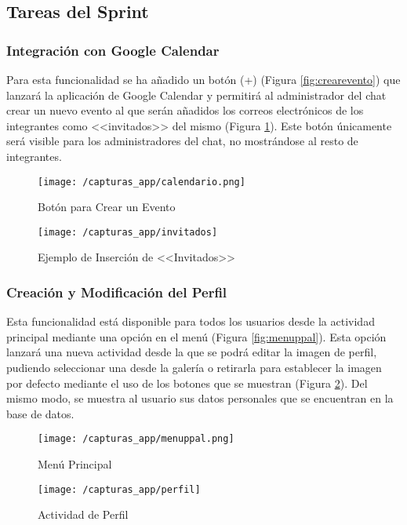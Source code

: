 \subsection{Tareas del Sprint}
\subsubsection{Integración con Google Calendar}
Para esta funcionalidad se ha añadido un botón (+) (Figura \ref{fig:crearevento}) que lanzará la aplicación de Google Calendar y permitirá al administrador del chat crear un nuevo evento al que serán añadidos los correos electrónicos de los integrantes como <<invitados>> del mismo (Figura \ref{fig:invitados}). Este botón únicamente será visible para los administradores del chat, no mostrándose al resto de integrantes.

\begin{figure}[!h]
	\centering
	\begin{minipage}{.5\textwidth}
		\centering
		\texttt{[image: /capturas\_app/calendario.png]}
		\caption{Botón para Crear un Evento}
		\label{fig:crearevento}
	\end{minipage}%
	\begin{minipage}{.5\textwidth}
		\centering
		\texttt{[image: /capturas\_app/invitados]}
		\caption{Ejemplo de Inserción de <<Invitados>>}
		\label{fig:invitados}
	\end{minipage}
\end{figure}

\clearpage

\subsubsection{Creación y Modificación del Perfil}
Esta funcionalidad está disponible para todos los usuarios desde la actividad principal mediante una opción en el menú (Figura \ref{fig:menuppal}). Esta opción lanzará una nueva actividad desde la que se podrá editar la imagen de perfil, pudiendo seleccionar una desde la galería o retirarla para establecer la imagen por defecto mediante el uso de los botones que se muestran (Figura \ref{fig:perfil}). Del mismo modo, se muestra al usuario sus datos personales que se encuentran en la base de datos.

\begin{figure}[!h]
	\centering
	\begin{minipage}{.5\textwidth}
		\centering
		\texttt{[image: /capturas\_app/menuppal.png]}
		\caption{Menú Principal}
		\label{fig:menuppal}
	\end{minipage}%
	\begin{minipage}{.5\textwidth}
		\centering
		\texttt{[image: /capturas\_app/perfil]}
		\caption{Actividad de Perfil}
		\label{fig:perfil}
	\end{minipage}
\end{figure}


